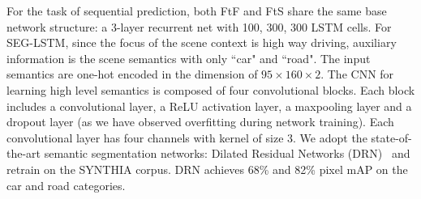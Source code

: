 \documentclass[10pt,twocolumn,letterpaper]{article}
\begin{document}
For the task of sequential prediction, both FtF and FtS share the same base network structure:
a 3-layer recurrent net with 100, 300, 300 LSTM cells.
For SEG-LSTM, since the focus of the scene context is high way driving, auxiliary information is the scene semantics with only ``car" and ``road". The input semantics are one-hot encoded in the dimension of $95\times160\times2$. The CNN for learning high level semantics is composed of four convolutional blocks. Each block includes a convolutional layer, a ReLU activation layer, a maxpooling layer and a dropout layer (as we have observed overfitting during network training). Each convolutional layer has four channels with kernel of size 3.
We adopt the state-of-the-art semantic segmentation networks: Dilated Residual Networks (DRN)~\cite{yu2017dilated} and retrain on the SYNTHIA corpus. DRN achieves 68\% and 82\% pixel mAP on the car and road categories.
\end{document}
